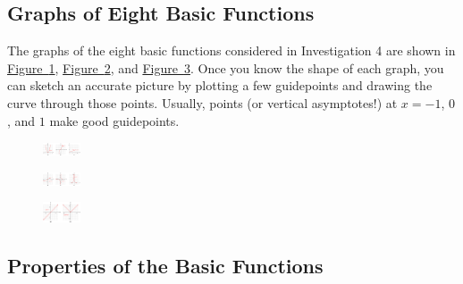 \documentclass[10pt,]{book}
\theoremstyle{plain}
\theoremstyle{definition}
\theoremstyle{definition}
\numberwithin{equation}{section}
\begin{document}
\subsection[Graphs of Eight Basic Functions]{Graphs of Eight Basic Functions}\label{subsection-39}

        The graphs of the eight basic functions considered in Investigation 4 are shown in \hyperref[fig-basic-a-c]{Figure~\ref{fig-basic-a-c}}, \hyperref[fig-basic-d-f]{Figure~\ref{fig-basic-d-f}}, and \hyperref[fig-basic-g-h]{Figure~\ref{fig-basic-g-h}}. Once you know the shape of each graph, you can sketch an accurate picture by plotting a few guidepoints and drawing the curve through those points. Usually, points (or vertical asymptotes!) at \(x = −1\), \(0\), and \(1\) make good guidepoints.
\leavevmode%
\begin{figure}
\centering
\includegraphics[width=0.100\textwidth,]{images/fig-basic-a-c.svg}\caption{\label{fig-basic-a-c}}
\end{figure}
\leavevmode%
\begin{figure}
\centering
\includegraphics[width=0.100\textwidth,]{images/fig-basic-d-f.svg}\caption{\label{fig-basic-d-f}}
\end{figure}
\leavevmode%
\begin{figure}
\centering
\includegraphics[width=0.100\textwidth,]{images/fig-basic-g-h.svg}\caption{\label{fig-basic-g-h}}
\end{figure}
\typeout{************************************************}
\typeout{************************************************}
\subsection[Properties of the Basic Functions]{Properties of the Basic Functions}\label{subsection-40}
\end{document}
